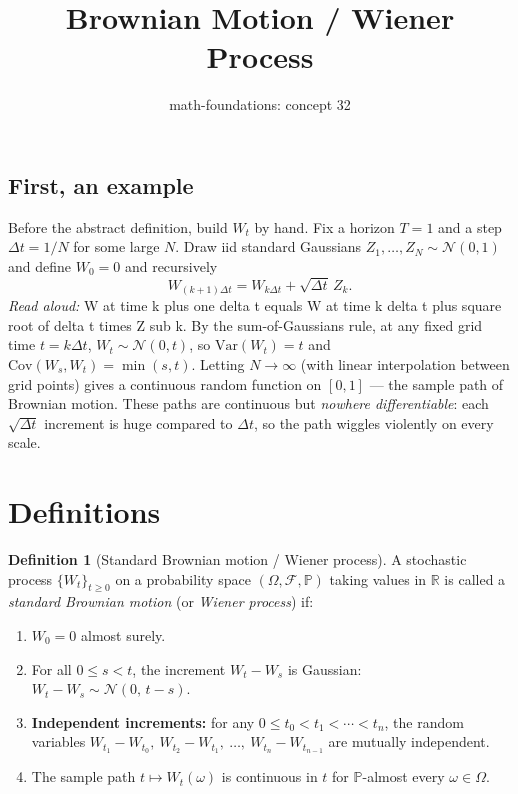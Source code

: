 \documentclass[11pt]{article}
\title{Brownian Motion / Wiener Process}
\author{math-foundations: concept 32}
\date{}
\theoremstyle{definition}
\newtheorem{definition}[theorem]{Definition}
\theoremstyle{remark}
\newcommand{\R}{\mathbb{R}}
\newcommand{\PP}{\mathbb{P}}
\newcommand{\Var}{\mathrm{Var}}
\newcommand{\Cov}{\mathrm{Cov}}
\newcommand{\F}{\mathcal{F}}
\begin{document}
\maketitle

\subsection*{First, an example}

Before the abstract definition, build $W_t$ by hand. Fix a horizon
$T = 1$ and a step $\Delta t = 1/N$ for some large $N$. Draw iid
standard Gaussians $Z_1, \dots, Z_N \sim \mathcal{N}(0,1)$ and define
$W_0 = 0$ and recursively
$$W_{(k+1)\Delta t} = W_{k\Delta t} + \sqrt{\Delta t}\, Z_k.$$
\emph{Read aloud:} W at time k plus one delta t equals W at time k delta t plus square root of delta t times Z sub k.
By the sum-of-Gaussians rule, at any fixed grid time $t = k\Delta t$,
$W_t \sim \mathcal{N}(0, t)$, so $\Var(W_t) = t$ and
$\Cov(W_s, W_t) = \min(s, t)$. Letting $N \to \infty$ (with linear
interpolation between grid points) gives a continuous random function
on $[0,1]$ — the sample path of Brownian motion. These paths are
continuous but \emph{nowhere differentiable}: each $\sqrt{\Delta t}$
increment is huge compared to $\Delta t$, so the path wiggles violently
on every scale.

\section{Definitions}

\begin{definition}[Standard Brownian motion / Wiener process]
A stochastic process $\{W_t\}_{t \geq 0}$ on a probability space
$(\Omega, \F, \PP)$ taking values in $\R$ is called a
\emph{standard Brownian motion} (or \emph{Wiener process}) if:
\begin{enumerate}
  \item $W_0 = 0$ almost surely.
  \item For all $0 \leq s < t$, the increment $W_t - W_s$ is Gaussian:
        $W_t - W_s \sim \mathcal{N}(0,\, t-s)$.
  \item \textbf{Independent increments:} for any
        $0 \leq t_0 < t_1 < \cdots < t_n$, the random variables
        $W_{t_1} - W_{t_0},\ W_{t_2} - W_{t_1},\ \dots,\ W_{t_n} - W_{t_{n-1}}$
        are mutually independent.
  \item The sample path $t \mapsto W_t(\omega)$ is continuous in $t$ for
        $\PP$-almost every $\omega \in \Omega$.
\end{enumerate}
\end{definition}
\end{document}

